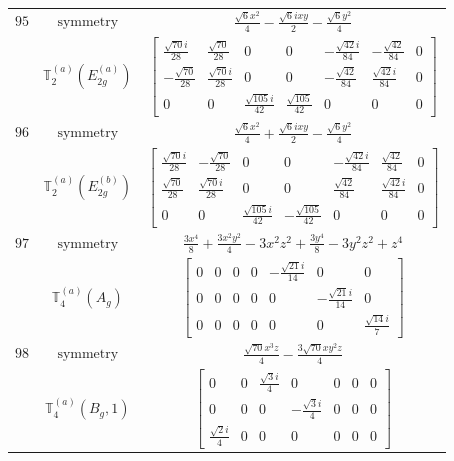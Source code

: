 \documentclass[fleqn,8pt,landscape]{jsarticle}
\begin{document}
\begin{longtable}{ccc}
$ 95 $ & $ \text{symmetry} $ & $ \frac{\sqrt{6} x^{2}}{4} - \frac{\sqrt{6} i x y}{2} - \frac{\sqrt{6} y^{2}}{4} $ \\
$  $ & $ \mathbb{T}_{2}^{(a)}(E_{2g}^{(a)}) $ & $ \begin{bmatrix} \frac{\sqrt{70} i}{28} & \frac{\sqrt{70}}{28} & 0 & 0 & - \frac{\sqrt{42} i}{84} & - \frac{\sqrt{42}}{84} & 0 \\ - \frac{\sqrt{70}}{28} & \frac{\sqrt{70} i}{28} & 0 & 0 & - \frac{\sqrt{42}}{84} & \frac{\sqrt{42} i}{84} & 0 \\ 0 & 0 & \frac{\sqrt{105} i}{42} & \frac{\sqrt{105}}{42} & 0 & 0 & 0 \end{bmatrix} $ \\ \hline
$ 96 $ & $ \text{symmetry} $ & $ \frac{\sqrt{6} x^{2}}{4} + \frac{\sqrt{6} i x y}{2} - \frac{\sqrt{6} y^{2}}{4} $ \\
$  $ & $ \mathbb{T}_{2}^{(a)}(E_{2g}^{(b)}) $ & $ \begin{bmatrix} \frac{\sqrt{70} i}{28} & - \frac{\sqrt{70}}{28} & 0 & 0 & - \frac{\sqrt{42} i}{84} & \frac{\sqrt{42}}{84} & 0 \\ \frac{\sqrt{70}}{28} & \frac{\sqrt{70} i}{28} & 0 & 0 & \frac{\sqrt{42}}{84} & \frac{\sqrt{42} i}{84} & 0 \\ 0 & 0 & \frac{\sqrt{105} i}{42} & - \frac{\sqrt{105}}{42} & 0 & 0 & 0 \end{bmatrix} $ \\ \hline
$ 97 $ & $ \text{symmetry} $ & $ \frac{3 x^{4}}{8} + \frac{3 x^{2} y^{2}}{4} - 3 x^{2} z^{2} + \frac{3 y^{4}}{8} - 3 y^{2} z^{2} + z^{4} $ \\
$  $ & $ \mathbb{T}_{4}^{(a)}(A_{g}) $ & $ \begin{bmatrix} 0 & 0 & 0 & 0 & - \frac{\sqrt{21} i}{14} & 0 & 0 \\ 0 & 0 & 0 & 0 & 0 & - \frac{\sqrt{21} i}{14} & 0 \\ 0 & 0 & 0 & 0 & 0 & 0 & \frac{\sqrt{14} i}{7} \end{bmatrix} $ \\ \hline
$ 98 $ & $ \text{symmetry} $ & $ \frac{\sqrt{70} x^{3} z}{4} - \frac{3 \sqrt{70} x y^{2} z}{4} $ \\
$  $ & $ \mathbb{T}_{4}^{(a)}(B_{g},1) $ & $ \begin{bmatrix} 0 & 0 & \frac{\sqrt{3} i}{4} & 0 & 0 & 0 & 0 \\ 0 & 0 & 0 & - \frac{\sqrt{3} i}{4} & 0 & 0 & 0 \\ \frac{\sqrt{2} i}{4} & 0 & 0 & 0 & 0 & 0 & 0 \end{bmatrix} $ \\ \hline

\end{longtable}
\end{document}
